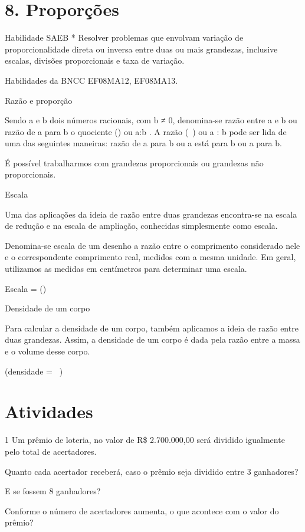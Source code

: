 {\section{8. Proporções}

Habilidade SAEB * Resolver problemas que envolvam variação de
proporcionalidade direta ou inversa entre duas ou mais grandezas,
inclusive escalas, divisões proporcionais e taxa de variação.

Habilidades da BNCC EF08MA12, EF08MA13.

Razão e proporção

Sendo a e b dois números racionais, com b ≠ 0, denomina-se razão entre a
e b ou razão de a para b o quociente () ou a:b . A razão
(\ ) ou a : b pode ser lida de uma das seguintes maneiras:
razão de a para b ou a está para b ou a para b.

É possível trabalharmos com grandezas proporcionais ou grandezas não
proporcionais.

Escala

Uma das aplicações da ideia de razão entre duas grandezas encontra-se na
escala de redução e na escala de ampliação, conhecidas simplesmente como
escala.

Denomina-se escala de um desenho a razão entre o comprimento considerado
nele e o correspondente comprimento real, medidos com a mesma unidade.
Em geral, utilizamos as medidas em centímetros para determinar uma
escala.

Escala =
()

Densidade de um corpo

Para calcular a densidade de um corpo, também aplicamos a ideia de razão
entre duas grandezas. Assim, a densidade de um corpo é dada pela razão
entre a massa e o volume desse corpo.

(densidade = \ )

\section{Atividades}

\num{1} Um prêmio de loteria, no valor de R\$ 2.700.000,00 será dividido
igualmente pelo total de acertadores.
\item Quanto cada acertador receberá, caso o prêmio seja dividido entre 3
ganhadores?
\item E se fossem 8 ganhadores?
\item Conforme o número de acertadores aumenta, o que acontece com o valor
do prêmio?

}
